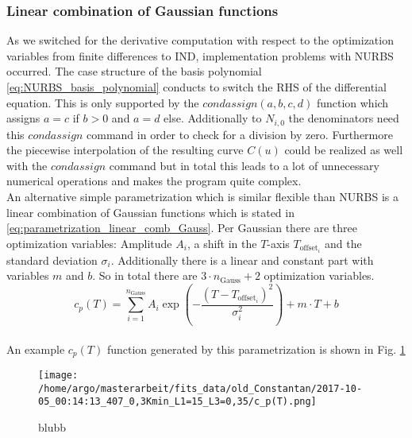 \documentclass{scrartcl}[12pt, halfparskip]
\begin{document}
\subsubsection{Linear combination of Gaussian functions}
As we switched for the derivative computation with respect to the optimization variables from finite differences to IND, implementation problems with NURBS occurred. 
The case structure of the basis polynomial \eqref{eq:NURBS_basis_polynomial} conducts to switch the RHS of the differential equation. This is only supported by the $condassign(a,b,c,d)$ function which assigns $a=c$ if $b>0$ and $a=d$ else. Additionally to $N_{i,0}$ the denominators need this $condassign$ command in order to check for a division by zero. 
Furthermore the piecewise interpolation of the resulting curve $C(u)$ could be realized as well with the $condassign$ command but in total this leads to a lot of unnecessary numerical operations and makes the program quite complex. \\
An alternative simple parametrization which is similar flexible than NURBS is a linear combination of Gaussian functions which is stated in \eqref{eq:parametrization_linear_comb_Gauss}. Per Gaussian there are three optimization variables: Amplitude $A_i$, a shift in the $T$-axis $T_{\text{offset}_i}$ and the standard deviation $\sigma_i$. Additionally there is a linear and constant part with variables $m$ and $b$. So in total there are $3 \cdot n_{\text{Gauss}} + 2$ optimization variables. \\


\begin{equation}
	c_p(T) = \sum_{i=1}^{n_{\text{Gauss}}} A_i \exp\left(- \frac{(T - T_{\text{offset}_i})^2}{\sigma_i^2}\right) + m \cdot T + b
	\label{eq:parametrization_linear_comb_Gauss}
\end{equation} \\

An example $c_p(T)$ function generated by this parametrization is shown in Fig. \ref{fig:parametrization_example_linear_comb_gauss}


\begin{figure}[H]
	\centering
	\texttt{[image: /home/argo/masterarbeit/fits\_data/old\_Constantan/2017-10-05\_00:14:13\_407\_0,3Kmin\_L1=15\_L3=0,35/c\_p(T).png]}
	\caption{blubb}
	\label{fig:parametrization_example_linear_comb_gauss}
\end{figure}
\end{document}
